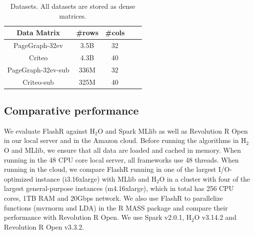 \begin{table}
\begin{center}
\caption{Datasets. All datasets are stored as dense matrices.}
\vspace{-10pt}
\footnotesize
\begin{tabular}{|c|c|c|c|c|}
\hline
Data Matrix & \#rows & \#cols \\
\hline
PageGraph-32ev \cite{webgraph} & 3.5B & 32 \\
\hline
Criteo \cite{criteo} & 4.3B & 40 \\
\hline
PageGraph-32ev-sub \cite{webgraph} & 336M & 32 \\
\hline
Criteo-sub \cite{criteo} & 325M & 40 \\
\hline
\end{tabular}
\normalsize
\label{tbl:data}
\end{center}
\vspace{-10pt}
\end{table}

\subsection{Comparative performance}
We evaluate FlashR against H$_2$O \cite{h2o} and Spark MLlib \cite{mllib} as well
as Revolution R Open \cite{rro} in our local server and in the Amazon cloud.
Before running the algorithms in H$_2$O and MLlib, we ensure that all data are
loaded and cached in memory. When running in the 48 CPU core local server,
all frameworks use 48 threads. When running in the cloud, we compare FlashR
running in one of the largest I/O-optimized instance (i3.16xlarge) with MLlib
and H$_2$O in a cluster with four of the largest general-purpose instances
(m4.16xlarge), which in total has 256 CPU cores, 1TB RAM
and 20Gbps network. We also use FlashR to parallelize functions (mvrnorm and LDA)
in the R MASS package and compare their performance with Revolution R Open. We use
Spark v2.0.1, H$_2$O v3.14.2 and Revolution R Open v3.3.2.

